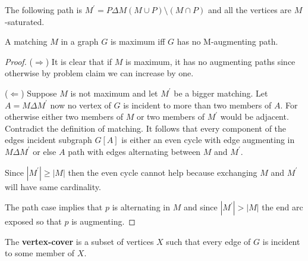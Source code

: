				The following path is $M^\prime = P\Delta M (M \cup P) \setminus (M \cap P)$ and all the vertices are $M$-saturated.

				\begin{figure}[!ht]
					\centering
				\end{figure}

				\begin{theorem}[Berge, 1957]
					A matching $M$ in a graph $G$ is maximum iff $G$ has no M-augmenting path.
				\end{theorem}

				\begin{proof}
					($\Rightarrow$) It is clear that if $M$ is maximum, it has no augmenting paths since otherwise by problem claim we can increase by one.

					($\Leftarrow$) Suppose $M$ is not maximum and let $M^\prime$ be a bigger matching. Let $A = M \Delta M^\prime$ now no vertex of $G$ is incident to more than two members of $A$. For otherwise either two members of $M$ or two members of $M^\prime$ would be adjacent. Contradict the definition of matching. It follows that every component of the edges incident subgraph $G[A]$ is either an even cycle with edge augmenting in $M\Delta M^\prime$ or else $A$ path with edges alternating between $M$ and $M^\prime$.

					Since $|M^\prime| \ge |M|$ then the even cycle cannot help because exchanging $M$ and $M^\prime$ will have same cardinality.

					The path case implies that $p$ is alternating in $M$ and since $|M^\prime| > |M|$ the end arc exposed so that $p$ is augmenting.
				\end{proof}

				\begin{definition}
					The \textbf{vertex-cover} is a subset of vertices $X$ such that every edge of $G$ is incident to some member of $X$.
				\end{definition}

